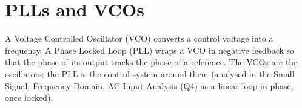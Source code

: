 \chapter{PLLs and VCOs}\label{ch:pll_vco}

A Voltage Controlled Oscillator (VCO) converts a control voltage into a
frequency. A Phase Locked Loop (PLL) wraps a VCO in negative feedback so
that the phase of its output tracks the phase of a reference. The VCOs are
the oscillators; the PLL is the control system around them (analysed in the
Small Signal, Frequency Domain, AC Input Analysis (Q4) as a linear loop in
phase, once locked).





